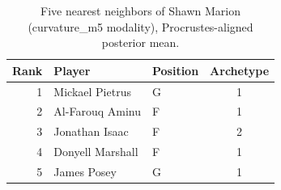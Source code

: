 \begin{table}[htbp]
  \centering\small
  \begin{tabular}{rllc}
    \toprule
    Rank & Player & Position & Archetype \\
    \midrule
    1 & Mickael Pietrus & G & 1 \\
    2 & Al-Farouq Aminu & F & 1 \\
    3 & Jonathan Isaac & F & 2 \\
    4 & Donyell Marshall & F & 1 \\
    5 & James Posey & G & 1 \\
    \bottomrule
  \end{tabular}
  \caption{Five nearest neighbors of Shawn Marion (curvature_m5 modality), Procrustes-aligned posterior mean.}
  \label{tab:Shawn_Marion_neighbors_curvature_m5}
\end{table}

